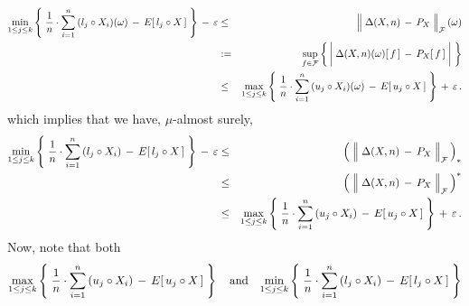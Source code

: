 \begin{eqnarray*}
	\underset{1\leq j \leq k}{\min}\left\{\;
		\dfrac{1}{n}\cdot \overset{n}{\underset{i=1}{\sum}}\,(l_{j} \circ X_{i})(\omega)
		\,\overset{{\color{white}+}}{-}\,
		E[\,l_{j} \circ X\,]
		\;\right\}
	\,\overset{{\color{white}+}}{-}\,
	\varepsilon
& \leq &
	\left\Vert\;\Delta(X,n) \,\overset{{\color{white}.}}{-}\, P_{X}\;\right\Vert_{\mathcal{F}}(\omega)
\\
& := &
	\underset{f\in\mathcal{F}}{\sup}\left\{\,
		\left\vert\; \Delta(X,n)(\omega)[\,f\,]\,\overset{{\color{white}+}}{-}\,P_{X}[\,f\,] \;\right\vert
	\;\right\}
\\
& \leq &
	\underset{1\leq j \leq k}{\max}\left\{\;
		\dfrac{1}{n}\cdot \overset{n}{\underset{i=1}{\sum}}\,(u_{j} \circ X_{i})(\omega)
		\,\overset{{\color{white}+}}{-}\,
		E[\,u_{j} \circ X\,]
		\;\right\}
	\,\overset{{\color{white}+}}{+}\,
	\varepsilon\,.
\end{eqnarray*}
which implies that we have, $\mu$-almost surely,
\begin{eqnarray*}
	\underset{1\leq j \leq k}{\min}\left\{\;
		\dfrac{1}{n}\cdot \overset{n}{\underset{i=1}{\sum}}\,(l_{j} \circ X_{i})
		\,\overset{{\color{white}+}}{-}\,
		E[\,l_{j} \circ X\,]
		\;\right\}
	\,\overset{{\color{white}+}}{-}\,
	\varepsilon
& \leq &
	\left(\;\left\Vert\;\Delta(X,n) \,\overset{{\color{white}.}}{-}\, P_{X}\;\right\Vert_{\mathcal{F}}\,\right)_{*}
\\
& \leq &
	\left(\;\left\Vert\;\Delta(X,n) \,\overset{{\color{white}.}}{-}\, P_{X}\;\right\Vert_{\mathcal{F}}\,\right)^{*}
\\
& \leq &
	\underset{1\leq j \leq k}{\max}\left\{\;
		\dfrac{1}{n}\cdot \overset{n}{\underset{i=1}{\sum}}\,(u_{j} \circ X_{i})
		\,\overset{{\color{white}+}}{-}\,
		E[\,u_{j} \circ X\,]
		\;\right\}
	\,\overset{{\color{white}+}}{+}\,
	\varepsilon\,.
\end{eqnarray*}
Now, note that both
\begin{equation*}
	\underset{1\leq j \leq k}{\max}\left\{\;
		\dfrac{1}{n}\cdot \overset{n}{\underset{i=1}{\sum}}\,(u_{j} \circ X_{i})
		\,\overset{{\color{white}+}}{-}\,
		E[\,u_{j} \circ X\,]
	\;\right\}
\quad\textnormal{and}\quad
	\underset{1\leq j \leq k}{\min}\left\{\;
		\dfrac{1}{n}\cdot \overset{n}{\underset{i=1}{\sum}}\,(l_{j} \circ X_{i})
		\,\overset{{\color{white}+}}{-}\,
		E[\,l_{j} \circ X\,]
	\;\right\}
\end{equation*}
